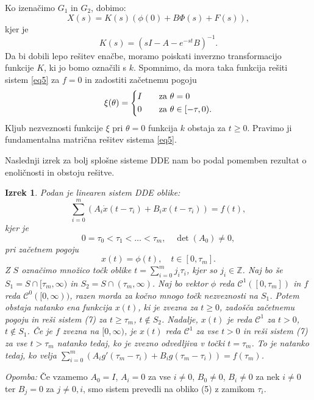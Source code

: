 \documentclass[12pt,a4paper]{amsart}
\theoremstyle{definition} %
\theoremstyle{plain} %
\newtheorem{izrek}[definicija]{Izrek}
\newcommand{\Z}{\mathbb Z}
\begin{document}
Ko izenačimo $G_1$ in $G_2$, dobimo:
\[X(s)=K(s)(\phi(0)+B\Phi(s)+F(s)),\]
kjer je 
\[K(s)=(sI-A-e^{-st}B)^{-1}.\]
Da bi dobili lepo rešitev enačbe, moramo poiskati inverzno transformacijo funkcije $K$, ki jo bomo označili s $k$.
Spomnimo, da mora taka funkcija rešiti sistem \eqref{eq5} za $f=0$ in zadostiti začetnemu pogoju
\[
        \xi(\theta) =
        \begin{dcases}
            I &\quad \text{za  } \theta=0 \\
            0 &\quad \text{za  } \theta \in [-\tau,0). \\
        \end{dcases}
    \]
Kljub nezveznosti funkcije $\xi$ pri $\theta=0$ funkcija $k$ obstaja za $t\geq0$. Pravimo ji fundamentalna matrična
rešitev sistema \eqref{eq5}.

Naslednji izrek za bolj splošne sisteme DDE nam bo podal pomemben rezultat o enoličnosti in obstoju rešitve.

\begin{izrek}
    Podan je linearen sistem DDE oblike:
    \begin{equation} \label{eq7}
        \sum_{i=0}^m\left(A_i\dot{x}(t-\tau_i)+B_ix(t-\tau_i)\right)=f(t),\end{equation}
    kjer je 
    \[0=\tau_0<\tau_1<\dots<\tau_m, \quad \det(A_0)\neq0,\]
    pri začetnem pogoju
    \[x(t)=\phi(t), \quad t \in[0,\tau_m].\]
    Z $S$ označimo množico točk oblike $t=\sum_{i=0}^{m}j_i\tau_i$, kjer so $j_i\in\Z$. Naj bo še $S_1=S\cap[\tau_m,\infty)$ in
    $S_2=S\cap(\tau_m,\infty)$. Naj bo vektor $\phi$ reda $\mathcal{C}^1([0,\tau_m])$ in $f$ reda $\mathcal{C}^0([0,\infty))$,
    razen morda za kočno mnogo točk nezveznosti na $S_1$. Potem obstaja natanko ena funkcija $x(t)$, ki je zvezna 
    za $t\geq0$, zadošča začetnemu pogoju in reši sistem (7) za $t\geq\tau_m$, $t\notin S_2$. Nadalje, $x(t)$ je reda
    $\mathcal{C}^1$ za $t>0$, $t\notin S_1$. Če je $f$ zvezna na $[0,\infty)$, je $x(t)$ reda $\mathcal{C}^1$ za vse $t>0$ in 
    reši sistem (7) za vse $t>\tau_m$ natanko tedaj, ko je zvezno odvedljiva v točki $t=\tau_m$. To je natanko tedaj, ko velja
    $\sum_{i=0}^m\left(A_ig'(\tau_m-\tau_i)+B_ig(\tau_m-\tau_i)\right)=f(\tau_m)$.
\end{izrek}

\noindent\textit{Opomba:} Če vzamemo $A_0=I$, $A_i=0$ za vse $i\neq0$, $B_0\neq0$, $B_i\neq0$ za nek $i\neq0$ ter 
$B_j=0$ za $j\neq0,i$, smo sistem prevedli na obliko (5) z zamikom $\tau_i$.
\end{document}
